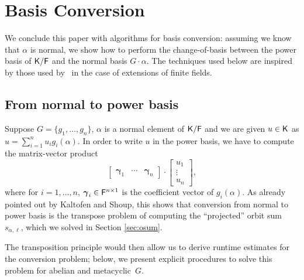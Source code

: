 \section{Basis Conversion}\label{sec:conversion}

We conclude this paper with algorithms for basis conversion: assuming
we know that $\alpha$ is normal, we show how to perform the
change-of-basis between the power basis of ${\mathsf{K}}/{\mathsf{F}}$ and the normal
basis $G\cdot \alpha$. The techniques used below are inspired by 
those used by~\cite[Section~4]{KalSho98} in the case of extensions
of finite fields.

\subsection{From normal to power basis} Suppose $G = \lbrace g_1, \ldots, g_n
\rbrace$, $\alpha$ is a normal element of ${\mathsf{K}}/{\mathsf{F}}$ and we are given $u\in {\mathsf{K}}$ 
as $u=\sum_{i=1}^n u_i g_i(\alpha)$. In order to write
$u $ in the power basis, we have to compute the matrix-vector 
product
\begin{equation}\label{eq:norm2pwrmat}
\left[\begin{array}{ccc}
\boldsymbol \gamma_1 & \cdots & \boldsymbol \gamma_n 
\end{array}\right]\cdot 
\begin{bmatrix}
u_1 \\ \vdots \\ u_n
\end{bmatrix},
\end{equation}
where for $i=1,\dots,n$, $\boldsymbol \gamma_i \in {\mathsf{F}}^{n\times 1}$ is
the coefficient vector of $g_i(\alpha)$. As already pointed out by
Kaltofen and Shoup, this shows that conversion from normal to power
basis is the transpose problem of computing the ``projected'' orbit
sum $s_{\alpha,\ell}$, which we solved in Section \ref{sec:osum}. 

The transposition principle would then allow us to derive runtime
estimates for the conversion problem; below, we present explicit
procedures to solve this problem for abelian and metacyclic~$G$.

